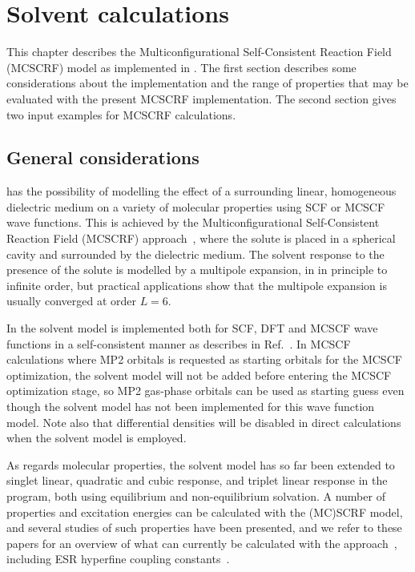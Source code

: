 \chapter{Solvent calculations}\label{ch:solvent}

This chapter describes the 
Multiconfigurational Self-Consistent Reaction Field (MCSCRF) model
as implemented in {\dalton}. The first section describes some
considerations about the implementation  and the range of
properties that may be evaluated with the present MCSCRF
implementation. The second section gives two input examples for
MCSCRF calculations.

\section{General considerations}\label{sec:solventimpl}

{\dalton} has the possibility of modelling the effect of a
surrounding linear, homogeneous dielectric
medium on a variety of molecular properties using
SCF or MCSCF
wave functions. This is achieved by the Multiconfigurational
Self-Consistent Reaction Field
(MCSCRF)
approach~\cite{kvmedpsjpc91,kvmhahjajthjcp89}, where the solute is
placed in a spherical cavity and surrounded by the
dielectric medium. The solvent response to the presence of the
solute is modelled by a multipole 
expansion, in {\dalton} in principle to infinite order, but
practical applications show that the multipole expansion is
usually converged at order $L=6$.

In {\dalton} the solvent model is implemented both for SCF, DFT and MCSCF wave
functions in a self-consistent manner as describes in
Ref.~\cite{kvmedpsjpc91,kvmhahjajthjcp89}. In MCSCF calculations where
MP2 orbitals is requested as starting orbitals for the MCSCF
optimization, the solvent model will not be added before entering the
MCSCF optimization stage, so MP2 gas-phase orbitals can be used as
starting guess even though the solvent model has not been implemented
for this wave function model. Note also that differential densities will be
disabled in direct calculations when the solvent model is employed.

As regards molecular properties, the solvent model has so far been
extended to singlet linear, quadratic and cubic response, and  triplet
linear response
in the {\resp} program, both using equilibrium and non-equilibrium
solvation. A number of properties and excitation energies can
be calculated with the (MC)SCRF model, and several studies of such
properties have been presented, and we refer to these papers for an
overview of what can currently be calculated with the
approach~\cite{kvmpjhjajjcp100,kvmylhapjjcp100}, including ESR
hyperfine coupling
constants~\cite{bfocobpjkvmjcp104}.

